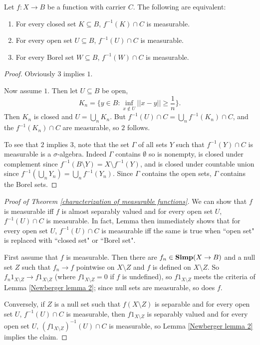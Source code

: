 \begin{lemma}
\label{Newberger lemma 3}
Let $f: X \to B$ be a function with carrier $C$. The following are equivalent:
\begin{enumerate}
\item For every closed set $K \subseteq B$, $f^{-1}(K) \cap C$ is measurable.
\item For every open set $U \subseteq B$, $f^{-1}(U) \cap C$ is measurable.
\item For every Borel set $W \subseteq B$, $f^{-1}(W) \cap C$ is measurable.
\end{enumerate}
\end{lemma}
\begin{proof}
Obviously $3$ implies $1$.

Now assume $1$. Then let $U \subseteq B$ be open,
$$K_n = \{y \in B: \inf_{x \notin U} ||x - y|| \geq \frac{1}{n}\}.$$
Then $K_n$ is closed and $U = \bigcup_n K_n$. But $f^{-1}(U) \cap C = \bigcup_n f^{-1}(K_n) \cap C$, and the $f^{-1}(K_n) \cap C$ are measurable, so $2$ follows.

To see that $2$ implies $3$, note that the set $\Gamma$ of all sets $Y$ such that $f^{-1}(Y) \cap C$ is measurable is a $\sigma$-algebra.
Indeed $\Gamma$ contains $\emptyset$ so is nonempty, is closed under complement since $f^{-1}(B \setminus Y) = X \setminus f^{-1}(Y)$, and is closed under countable union since $f^{-1}(\bigcup_n Y_n) = \bigcup_n f^{-1}(Y_n)$.
Since $\Gamma$ contains the open sets, $\Gamma$ contains the Borel sets.
\end{proof}

\begin{proof}[Proof of Theorem \ref{characterization of measurable functions}]
We can show that $f$ is measurable iff $f$ is almost separably valued and for every open set $U$, $f^{-1}(U) \cap C$ is measurable.
In fact, Lemma \label{Newberger lemma 3} then immediately shows that for every open set $U$, $f^{-1}(U) \cap C$ is measurable iff the same is true when ``open set" is replaced with ``closed set" or ``Borel set".

First assume that $f$ is measurable. Then there are $f_n \in \mathbf{Simp}(X \to B)$ and a null set $Z$ such that $f_n \to f$ pointwise on $X \setminus Z$ and $f$ is defined on $X \setminus Z$.
So $f_n1_{X \setminus Z} \to f1_{X \setminus Z}$ (where $f1_{X \setminus Z} = 0$ if $f$ is undefined), so $f1_{X \setminus Z}$ meets the criteria of Lemma \ref{Newberger lemma 2}; since null sets are measurable, so does $f$.

Conversely, if $Z$ is a null set such that $f(X \setminus Z)$ is separable and for every open set $U$, $f^{-1}(U) \cap C$ is measurable, then $f1_{X \setminus Z}$ is separably valued and for every open set $U$, $(f1_{X \setminus Z})^{-1}(U) \cap C$ is measurable, so Lemma \ref{Newberger lemma 2} implies the claim.
\end{proof}

